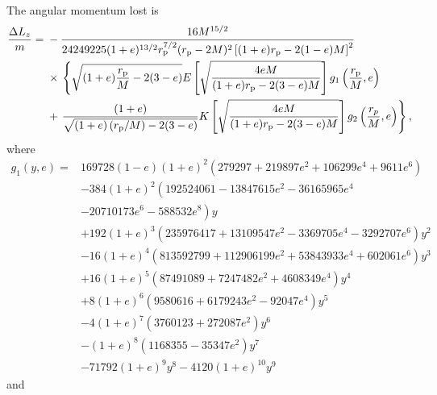 The angular momentum lost is
\begin{align}
\dfrac{\Delta L_z}{m} = {} & - \dfrac{16 M^{{15}/{2}}}{24249225 (1 + e)^{{13}/{2}} r_\mathrm{p}^{{7}/{2}} (r_\mathrm{p} - 2 M)^2 \left[(1 + e) r_\mathrm{p} - 2 (1 - e) M\right]^{2}} \nonumber \\
 {} & \times {} \left\{\sqrt{(1 + e) \dfrac{r_\mathrm{p}}{M} - 2(3 - e)} E\left[\sqrt{\dfrac{4 e M}{(1+e) r_\mathrm{p} - 2(3 - e)M}}\right] g_1\left(\dfrac{r_\mathrm{p}}{M}, e\right) \right. \nonumber \\
 {} & + \left. \dfrac{(1 + e)}{\sqrt{(1 + e)\left(r_\mathrm{p}/M\right) - 2(3 - e)}} K\left[\sqrt{\dfrac{4 e M}{(1+e) r_\mathrm{p} - 2(3 - e)M}}\right] g_2\left(\dfrac{r_{p}}{M}, e\right)\right\},
\end{align}
where
\begin{align}
g_1(y, e) = {} & 169728 (1 - e) (1 + e)^2 \left(279297 + 219897 e^2 + 106299 e^4 + 9611 e^6 \right) \nonumber \\
 {} & - \left. 384 (1 + e)^2 \left(192524061 - 13847615 e^2 - 36165965 e^4 \right.\right. \nonumber \\
 {} &- \left.\left. 20710173 e^6 - 588532 e^8\right) y \right. \nonumber \\
 {} & + \left. 192 (1 + e)^3 \left(235976417 + 13109547 e^2 - 3369705 e^4 - 3292707e^6\right) y^2 \right. \nonumber \\
 {} & - \left. 16 (1 + e)^4 \left(813592799 + 112906199 e^2 + 53843933 e^4 + 602061 e^6\right) y^3 \right. \nonumber \\
 {} & + \left. 16 (1 + e)^5 \left(87491089 + 7247482 e^2 + 4608349 e^4\right) y^4 \right. \nonumber \\
 {} & + \left. 8 (1 + e)^6 \left(9580616 + 6179243 e^2 - 92047 e^4\right) y^5 \right. \nonumber \\
 {} & - \left. 4 (1 + e)^7 \left(3760123 + 272087 e^2 \right) y^6 \right. \nonumber \\
 {} & - \left. (1 + e)^8 \left(1168355 - 35347 e^2\right) y^7 \right. \nonumber \\
 {} & - \left. 71792 (1 + e)^9 y^8 - 4120 (1 + e)^{10} y^9 \right.
\end{align}
and
